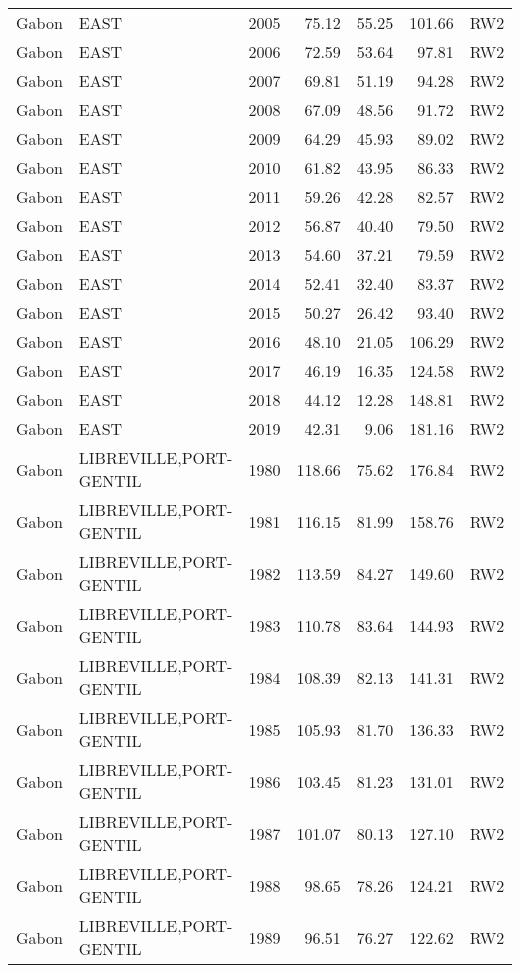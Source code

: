 \begin{longtable}{lllrrrl}
  Gabon & EAST & 2005 & 75.12 & 55.25 & 101.66 & RW2 \\ 
  Gabon & EAST & 2006 & 72.59 & 53.64 & 97.81 & RW2 \\ 
  Gabon & EAST & 2007 & 69.81 & 51.19 & 94.28 & RW2 \\ 
  Gabon & EAST & 2008 & 67.09 & 48.56 & 91.72 & RW2 \\ 
  Gabon & EAST & 2009 & 64.29 & 45.93 & 89.02 & RW2 \\ 
  Gabon & EAST & 2010 & 61.82 & 43.95 & 86.33 & RW2 \\ 
  Gabon & EAST & 2011 & 59.26 & 42.28 & 82.57 & RW2 \\ 
  Gabon & EAST & 2012 & 56.87 & 40.40 & 79.50 & RW2 \\ 
  Gabon & EAST & 2013 & 54.60 & 37.21 & 79.59 & RW2 \\ 
  Gabon & EAST & 2014 & 52.41 & 32.40 & 83.37 & RW2 \\ 
  Gabon & EAST & 2015 & 50.27 & 26.42 & 93.40 & RW2 \\ 
  Gabon & EAST & 2016 & 48.10 & 21.05 & 106.29 & RW2 \\ 
  Gabon & EAST & 2017 & 46.19 & 16.35 & 124.58 & RW2 \\ 
  Gabon & EAST & 2018 & 44.12 & 12.28 & 148.81 & RW2 \\ 
  Gabon & EAST & 2019 & 42.31 & 9.06 & 181.16 & RW2 \\ 
  Gabon & LIBREVILLE,PORT-GENTIL & 1980 & 118.66 & 75.62 & 176.84 & RW2 \\ 
  Gabon & LIBREVILLE,PORT-GENTIL & 1981 & 116.15 & 81.99 & 158.76 & RW2 \\ 
  Gabon & LIBREVILLE,PORT-GENTIL & 1982 & 113.59 & 84.27 & 149.60 & RW2 \\ 
  Gabon & LIBREVILLE,PORT-GENTIL & 1983 & 110.78 & 83.64 & 144.93 & RW2 \\ 
  Gabon & LIBREVILLE,PORT-GENTIL & 1984 & 108.39 & 82.13 & 141.31 & RW2 \\ 
  Gabon & LIBREVILLE,PORT-GENTIL & 1985 & 105.93 & 81.70 & 136.33 & RW2 \\ 
  Gabon & LIBREVILLE,PORT-GENTIL & 1986 & 103.45 & 81.23 & 131.01 & RW2 \\ 
  Gabon & LIBREVILLE,PORT-GENTIL & 1987 & 101.07 & 80.13 & 127.10 & RW2 \\ 
  Gabon & LIBREVILLE,PORT-GENTIL & 1988 & 98.65 & 78.26 & 124.21 & RW2 \\ 
  Gabon & LIBREVILLE,PORT-GENTIL & 1989 & 96.51 & 76.27 & 122.62 & RW2 \\ 

\end{longtable}
